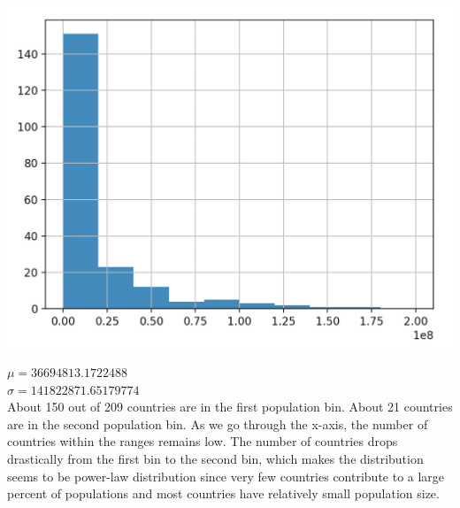 \documentclass[12pt]{article}
\begin{document}
\begin{center}
    \includegraphics[scale=0.6]{fig/p3.png}
\end{center}
$\mu = 36694813.1722488$\\
$\sigma = 141822871.65179774$\\
About 150 out of 209 countries are in the first population bin. About 21 countries are in the second population bin. As
we go through the x-axis, the number of countries within the ranges remains low. The number of countries drops drastically
from the first bin to the second bin, which makes the distribution seems to be power-law distribution since very few countries contribute to a large
percent of populations and most countries have relatively small population size.
\end{document}
